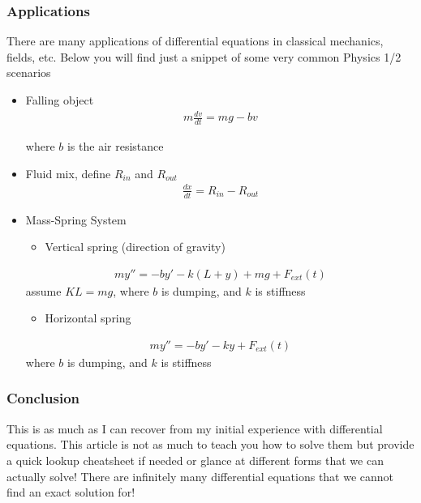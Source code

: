 \documentclass[12pt]{article}
\begin{document}
\subsubsection*{Applications}
\label{sec:orgeff0768}
There are many applications of differential equations in classical
mechanics, fields, etc. Below you will find just a snippet of some very
common Physics 1/2 scenarios
\begin{itemize}
\item Falling object
\label{sec:orgcd7a095}
\begin{align*}
	m\frac{dv}{dt}=mg-bv
\end{align*}

where \(b\) is the air resistance
\item Fluid mix, define \(R_{in}\) and \(R_{out}\)
\label{sec:orge7c1c2f}
\begin{align*}
	\frac{dx}{dt}=R_{in}-R_{out}
\end{align*}
\item Mass-Spring System
\label{sec:org2204344}
\begin{itemize}
\item Vertical spring (direction of gravity)
\end{itemize}
\begin{align*}
	my''=-by'-k(L+y)+mg+F_{ext}(t)
\end{align*}
assume \(KL=mg\), where \(b\) is dumping, and \(k\) is stiffness

\begin{itemize}
\item Horizontal spring
\end{itemize}
\begin{align*}
	my''=-by'-ky+F_{ext}(t)
\end{align*}
where \(b\) is dumping, and \(k\) is stiffness
\end{itemize}

\subsubsection*{Conclusion}
\label{sec:org837610a}
This is as much as I can recover from my initial experience with differential
equations. This article is not as much to teach you how to solve them but
provide a quick lookup cheatsheet if needed or glance at different forms that we
can actually solve! There are infinitely many differential equations that we
cannot find an exact solution for!
\end{document}
